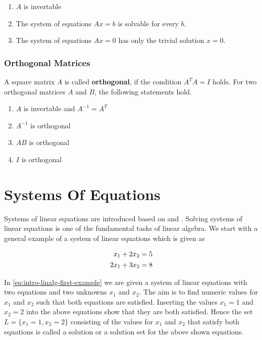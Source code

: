 \documentclass[
]{book}
\providecommand{\tightlist}{%
  \setlength{\itemsep}{0pt}\setlength{\parskip}{0pt}}
\begin{document}
\begin{enumerate}
\def\labelenumi{\arabic{enumi}.}
\tightlist
\item
  \(A\) is invertable
\item
  The system of equations \(Ax = b\) is solvable for every \(b\).
\item
  The system of equations \(Ax = 0\) has only the trivial solution \(x=0\).
\end{enumerate}

\hypertarget{intro-linalg-orthogonal-matrix}{%
\subsubsection{Orthogonal Matrices}\label{intro-linalg-orthogonal-matrix}}

A square matrix \(A\) is called \textbf{orthogonal}, if the condition \(A^TA = I\) holds. For two orthogonal matrices \(A\) and \(B\), the following statements hold.

\begin{enumerate}
\def\labelenumi{\arabic{enumi}.}
\tightlist
\item
  \(A\) is invertable and \(A^{-1} = A^T\)
\item
  \(A^{-1}\) is orthogonal
\item
  \(AB\) is orthogonal
\item
  \(I\) is orthogonal
\end{enumerate}

\hypertarget{intro-linalg-systems-of-equations}{%
\section{Systems Of Equations}\label{intro-linalg-systems-of-equations}}

Systems of linear equations are introduced based on \citep{Nipp2002} and \citep{Searle1971}. Solving systems of linear equations is one of the fundamental tasks of linear algebra. We start with a general example of a system of linear equations which is given as

\begin{align}
 x_1 + 2x_2 &= 5 \notag \\
2x_1 + 3x_2 &= 8
\label{eq:intro-linalg-first-example}
\end{align}

In \eqref{eq:intro-linalg-first-example} we are given a system of linear equations with two equations and two unknowns \(x_1\) and \(x_2\). The aim is to find numeric values for \(x_1\) and \(x_2\) such that both equations are satisfied. Inserting the values \(x_1 = 1\) and \(x_2 = 2\) into the above equations show that they are both satisfied. Hence the set \(L = \{x_1 = 1, x_2 = 2\}\) consisting of the values for \(x_1\) and \(x_2\) that satisfy both equations is called a solution or a solution set for the above shown equations.
\end{document}
